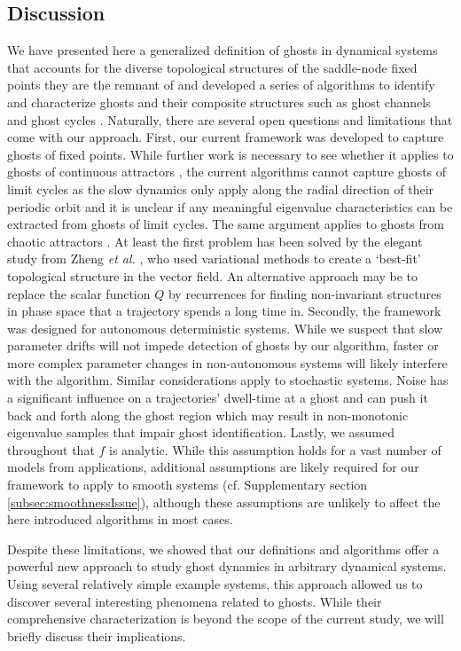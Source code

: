 \documentclass{article}
\theoremstyle{definition}
\begin{document}
\begin{refsection}
\section{Discussion}\label{sec:discussion}
We have presented here a generalized definition of ghosts in dynamical systems that accounts for the diverse topological structures of the saddle-node fixed points they are the remnant of and developed a series of algorithms to identify and characterize ghosts and their composite structures such as ghost channels and ghost cycles \cite{Koch_2024}. 
Naturally, there are several open questions and limitations that come with our approach. First, our current framework was developed to capture ghosts of fixed points. While further work is necessary to see whether it applies to ghosts of continuous attractors \cite{Fontich2022,Sagodi2025}, the current algorithms cannot capture ghosts of limit cycles as the slow dynamics only apply along the radial direction of their periodic orbit and it is unclear if any meaningful eigenvalue characteristics can be extracted from ghosts of limit cycles. The same argument applies to ghosts from chaotic attractors \cite{Mehling2024,borner2025boundary}. At least the first problem has been solved by the elegant study from Zheng \textit{et al.} \cite{Zheng2025}, who used variational methods to create a `best-fit' topological structure in the vector field. An alternative approach may be to replace the scalar function $Q$ by recurrences \cite{Datseris2022} for finding non-invariant structures in phase space that a trajectory spends a long time in. Secondly, the framework was designed for autonomous deterministic systems. While we suspect that slow parameter drifts will not impede detection of ghosts by our algorithm, faster or more complex parameter changes in non-autonomous systems will likely interfere with the algorithm. Similar considerations apply to stochastic systems. Noise has a significant influence on a trajectories' dwell-time at a ghost and can push it back and forth along the ghost region \cite{Sardanys2020,Koch_2024} which may result in non-monotonic eigenvalue samples that impair ghost identification. Lastly, we assumed throughout that $f$ is analytic. While this assumption holds for a vast number of models from applications, additional assumptions are likely required for our framework to apply to smooth systems (cf. Supplementary section \ref{subsec:smoothnessIssue}), although these assumptions are unlikely to affect the here introduced algorithms in most cases.

Despite these limitations, we showed that our definitions and algorithms offer a powerful new approach to study ghost dynamics in arbitrary dynamical systems. Using several relatively simple example systems, this approach allowed us to discover several interesting phenomena related to ghosts. While their comprehensive characterization is beyond the scope of the current study, we will briefly discuss their implications.


\end{refsection}
\end{document}
